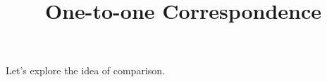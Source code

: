\documentclass{ximera}
\title{One-to-one Correspondence}
\begin{document}
\begin{abstract}
\end{abstract}
\maketitle

Let's explore the idea of comparison.
\end{document}

